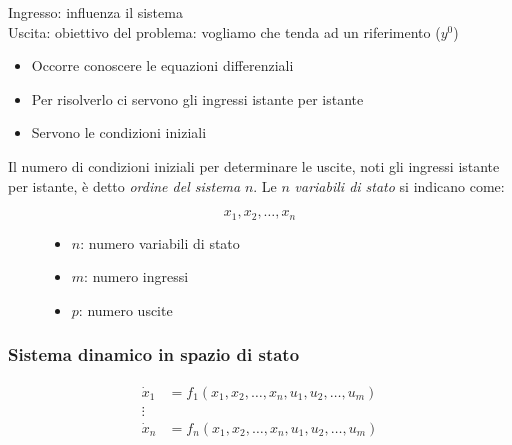 	\begin{figure}[H]
		\centering
                        \end{figure}
			Ingresso: influenza il sistema\\
			Uscita: obiettivo del problema: vogliamo che tenda ad un riferimento ($ y^0 $)\\
	\begin{itemize}
		\item Occorre conoscere le equazioni differenziali
		\item Per risolverlo ci servono gli ingressi istante per istante
		\item Servono le condizioni iniziali
	\end{itemize}
	Il numero di condizioni iniziali per determinare le uscite, noti gli ingressi istante per istante, è detto \emph{ordine del sistema} $ n $.
	Le $ n $ \emph{variabili di stato} si indicano come:
	\begin{figure}[H]
		\begin{minipage}{.4\textwidth}
			\centering
			\begin{equation*}
				\boxed{x_1,x_2,\dots,x_n}
			\end{equation*}
		\end{minipage}
		\begin{minipage}{.4\textwidth}
			\centering
			\begin{itemize}
				\item $ n $: numero variabili di stato
				\item $ m $: numero ingressi
				\item $ p $: numero uscite
			\end{itemize}
		\end{minipage}
	\end{figure}
	
	\subsubsection{Sistema dinamico in spazio di stato}
	\begin{align*}
		\dot{x}_1 &= f_1(x_1,x_2,\dots,x_n,u_1,u_2,\dots,u_m)\\
		\vdots &\\
		\dot x_n &= f_n(x_1,x_2,\dots,x_n,u_1,u_2,\dots,u_m)
	\end{align*}
	
